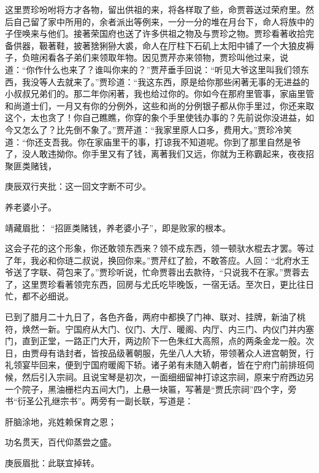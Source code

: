 \begin{parag}
    这里贾珍吩咐将方才各物，留出供祖的来，将各样取了些，命贾蓉送过荣府里。然后自己留了家中所用的，余者派出等例来，一分一分的堆在月台下，命人将族中的子侄唤来与他们。接著荣国府也送了许多供祖之物及与贾珍之物。贾珍看著收拾完备供器，靸著鞋，披著猞猁狲大裘，命人在厅柱下石矶上太阳中铺了一个大狼皮褥子，负暄闲看各子弟们来领取年物。因见贾芹亦来领物，贾珍叫他过来，说道：“你作什么也来了？谁叫你来的？”贾芹垂手回说：“听见大爷这里叫我们领东西，我没等人去就来了。”贾珍道：“我这东西，原是给你那些闲著无事的无进益的小叔叔兄弟们的。那二年你闲著，我也给过你的。你如今在那府里管事，家庙里管和尚道士们，一月又有你的分例外，这些和尚的分例银子都从你手里过，你还来取这个，太也贪了！你自己瞧瞧，你穿的象个手里使钱办事的？先前说你没进益，如今又怎么了？比先倒不象了。”贾芹道：“我家里原人口多，费用大。”贾珍冷笑道：“你还支吾我。你在家庙里干的事，打谅我不知道呢。你到了那里自然是爷了，没人敢违拗你。你手里又有了钱，离著我们又远，你就为王称霸起来，夜夜招聚匪类赌钱，\begin{note}庚辰双行夹批：这一回文字断不可少。\end{note}养老婆小子。\begin{note}靖藏眉批： “招匪类赌钱，养老婆小子”，即是败家的根本。\end{note}这会子花的这个形象，你还敢领东西来？领不成东西，领一顿驮水棍去才罢。等过了年，我必和你琏二叔说，换回你来。”贾芹红了脸，不敢答应。人回：“北府水王爷送了字联、荷包来了。”贾珍听说，忙命贾蓉出去款待，“只说我不在家。”贾蓉去了，这里贾珍看著领完东西，回房与尤氏吃毕晚饭，一宿无话。至次日，更比往日忙，都不必细说。
\end{parag}


\begin{parag}
    已到了腊月二十九日了，各色齐备，两府中都换了门神、联对、挂牌，新油了桃符，焕然一新。宁国府从大门、仪门、大厅、暖阁、内厅、内三门、内仪门并内塞门，直到正堂，一路正门大开，两边阶下一色朱红大高照，点的两条金龙一般。次日，由贾母有诰封者，皆按品级著朝服，先坐八人大轿，带领著众人进宫朝贺，行礼领宴毕回来，便到宁国府暖阁下轿。诸子弟有未随入朝者，皆在宁府门前排班伺候，然后引入宗祠。且说宝琴是初次，一面细细留神打谅这宗祠，原来宁府西边另一个院子，黑油栅栏内五间大门，上悬一块匾，写著是“贾氏宗祠”四个字，旁书“衍圣公孔继宗书”。两旁有一副长联，写道是：
\end{parag}


\begin{poem}
    \begin{pl}肝脑涂地，兆姓赖保育之恩；
    \end{pl}
    \begin{pl}功名贯天，百代仰蒸尝之盛。\end{pl}
    \begin{note}庚辰眉批：此联宜掉转。\end{note}
\end{poem}


